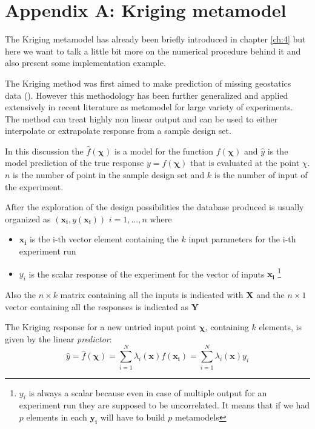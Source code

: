 \chapter*{Appendix A: Kriging metamodel}

The Kriging metamodel has already been briefly introduced in chapter \ref{ch:4} but here we want to talk a little bit more on the numerical procedure behind it and also present some implementation example.

The Kriging method was first aimed to make prediction of missing geostatics data (\citet{krige1951statistical}). However this methodology has been further generalized and applied extensively in recent literature as metamodel for large variety of experiments.
The method can treat highly non linear output and can be used to either interpolate or extrapolate response from a sample design set.

In this discussion the $\hat{f}(\boldsymbol{\chi})$ is a model for the function $f(\boldsymbol{\chi})$ and $\hat{y}$ is the model prediction of the true response $y = f(\boldsymbol{\chi})$ that is evaluated at the point $\chi$. $n$ is the number of point in the sample design set and $k$ is the number of input of the experiment.

After the exploration of the design possibilities the database produced is usually organized as $(\mathbf{x_i}, y(\mathbf{x_i}))$  $i=1,...,n$ where
\begin{itemize}
	\item $\mathbf{x_i}$ is the i-th vector element containing the $k$ input parameters for the i-th experiment run
	\item $y_i$ is the scalar response of the experiment for the vector of inputs $\mathbf{x_i}$ \footnote{$y_i$ is always a scalar because even in case of multiple output for an experiment run they are supposed to be uncorrelated. It means that if we had $p$ elements in each $\mathbf{y_i}$ will have to build $p$ metamodels}
\end{itemize}
Also the $n \times k$ matrix containing all the inputs is indicated with $\mathbf{X}$ and the $n \times 1$ vector containing all the responses is indicated as $\mathbf{Y}$

The Kriging response for a new untried input point $\boldsymbol{\chi}$, containing $k$ elements, is given by the linear \textit{predictor}:
\begin{equation}
\hat{y} = \hat{f}(\boldsymbol{\chi}) = \sum_{i=1}^{N} \lambda_i(\mathbf{x}) f(\mathbf{x_i}) =  \sum_{i=1}^{N} \lambda_i(\mathbf{x}) y_i
\end{equation}

